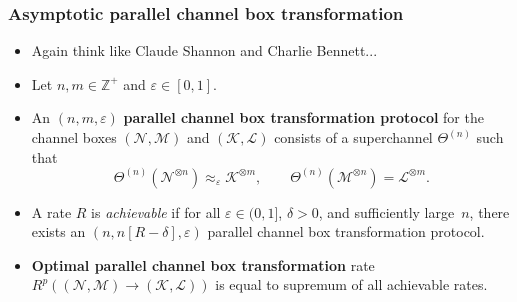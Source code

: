 \documentclass[usenames,dvipsnames,handout]{beamer}
\begin{document}
\begin{frame}
\frametitle{Asymptotic parallel  channel box transformation}

\begin{itemize}

\pause
\item Again think like Claude Shannon and Charlie Bennett...

\pause
\vspace{.1in}
\item Let $n,m\in\mathbb{Z}^{+}$ and $\varepsilon\in\left[  0,1\right]
$.

\pause
\vspace{.1in}
\item An $(n,m,\varepsilon)$ {\color{MidnightBlue}\textbf{parallel channel box transformation protocol}} for the channel boxes
$(\mathcal{N},\mathcal{M})$ and $(\mathcal{K},\mathcal{L})$ consists of a superchannel $\Theta^{(n)}$
such that
$$
\Theta^{(n)}(\mathcal{N}^{\otimes n}) \approx_{\varepsilon}%
\mathcal{K}^{\otimes m},\qquad
\Theta^{(n)}(\mathcal{M}^{\otimes n})=\mathcal{L}^{\otimes
m}.
$$

\pause
\vspace{.1in}
\item
A rate $R$ is \textit{achievable} if for all $\varepsilon\in(0,1]$,
$\delta>0$, and sufficiently large~$n$, there exists an $(n,n[R-\delta
],\varepsilon)$ parallel channel box transformation protocol.

\pause
\vspace{.1in}
\item {\color{MidnightBlue}\textbf{Optimal parallel channel box transformation}}
rate $R^p((\mathcal{N},\mathcal{M})\rightarrow(\mathcal{K},\mathcal{L}))$ is equal to supremum
of all achievable rates.

\end{itemize}

\end{frame}
\end{document}

